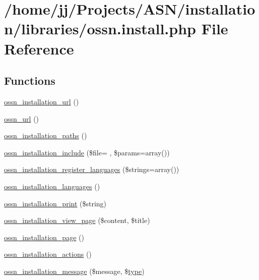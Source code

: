 \hypertarget{ossn_8install_8php}{}\section{/home/jj/\+Projects/\+A\+S\+N/installation/libraries/ossn.install.\+php File Reference}
\label{ossn_8install_8php}
\subsection*{Functions}
\begin{DoxyCompactItemize}
\item 
\hyperlink{ossn_8install_8php_a25d4dcc42385c4e21ee288c81f259458}{ossn\+\_\+installation\+\_\+url} ()
\item 
\hyperlink{ossn_8install_8php_a97af879f91996487b1093c01e33689f8}{ossn\+\_\+url} ()
\item 
\hyperlink{ossn_8install_8php_aee293727c85b476f39c8c4d5a1774b48}{ossn\+\_\+installation\+\_\+paths} ()
\item 
\hyperlink{ossn_8install_8php_a2a312d6b40eeab4f2bff4b5116781cb5}{ossn\+\_\+installation\+\_\+include} (\$file= \textquotesingle{}\textquotesingle{}, \$params=array())
\item 
\hyperlink{ossn_8install_8php_a97c14a3f465b3c0370729bcebc6cefb1}{ossn\+\_\+installation\+\_\+register\+\_\+languages} (\$strings=array())
\item 
\hyperlink{ossn_8install_8php_aa175551902e28ae322bc45c05ff5ee65}{ossn\+\_\+installation\+\_\+languages} ()
\item 
\hyperlink{ossn_8install_8php_a560b8c630618c02ac2dd8ecbe534b6b8}{ossn\+\_\+installation\+\_\+print} (\$string)
\item 
\hyperlink{ossn_8install_8php_a5e59331a0641b8d449a0f147da4a1ed6}{ossn\+\_\+installation\+\_\+view\+\_\+page} (\$content, \$title)
\item 
\hyperlink{ossn_8install_8php_ab54a9b9319e48168191889fa021d655d}{ossn\+\_\+installation\+\_\+page} ()
\item 
\hyperlink{ossn_8install_8php_aadcb0bf821dee932a5dfed69b2a34aa8}{ossn\+\_\+installation\+\_\+actions} ()
\item 
\hyperlink{ossn_8install_8php_a8b23c77f42cdb1f5638c78b7d61c9468}{ossn\+\_\+installation\+\_\+message} (\$message, \$\hyperlink{_ossn_wall_2actions_2wall_2post_2group_8php_a2dc1bb4e1ed0029daa81ac0776b14b51}{type})

\end{DoxyCompactItemize}
